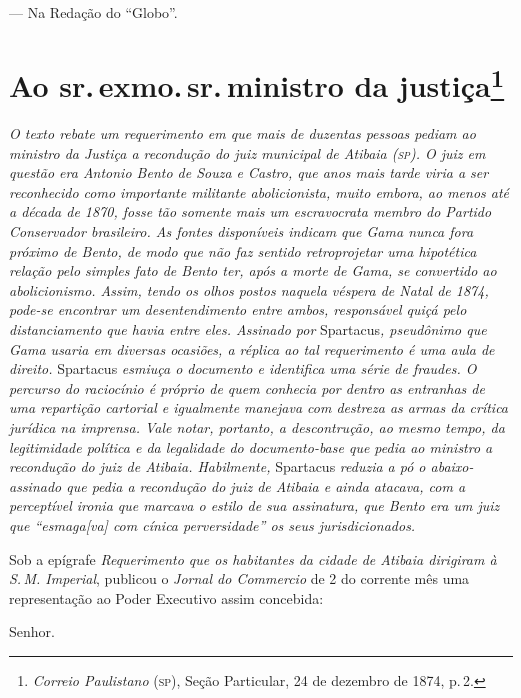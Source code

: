 --- Na Redação do ``Globo''.

\chapter{Ao sr.\,exmo.\,sr.\,ministro da justiça\footnote{\emph{Correio Paulistano} (\textsc{sp}), Seção Particular,
  24 de dezembro de 1874, p.\,2.}} %

\begin{didascalia}
\emph{O texto rebate um requerimento em que mais de duzentas pessoas
pediam ao ministro da Justiça a recondução do juiz municipal de Atibaia
(\textsc{sp}). O juiz em questão era Antonio Bento de Souza e Castro, que anos
mais tarde viria a ser reconhecido como importante militante
abolicionista, muito embora, ao menos até a década de 1870, fosse tão
somente mais um escravocrata membro do Partido Conservador brasileiro.
As fontes disponíveis indicam que Gama nunca fora próximo de Bento, de
modo que não faz sentido retroprojetar uma hipotética relação pelo
simples fato de Bento ter, após a morte de Gama, se convertido ao
abolicionismo. Assim, tendo os olhos postos naquela véspera de Natal de
1874, pode-se encontrar um desentendimento entre ambos, responsável
quiçá pelo distanciamento que havia entre eles. Assinado por}
Spartacus\emph{, pseudônimo que Gama usaria em diversas ocasiões, a
réplica ao tal requerimento é uma aula de direito.} Spartacus
\emph{esmiuça o documento e identifica uma série de fraudes. O percurso
do raciocínio é próprio de quem conhecia por dentro as entranhas de uma
repartição cartorial e igualmente manejava com destreza as armas da
crítica jurídica na imprensa. Vale notar, portanto, a descontrução, ao
mesmo tempo, da legitimidade política e da legalidade do documento-base
que pedia ao ministro a recondução do juiz de Atibaia. Habilmente,}
Spartacus \emph{reduzia a pó o abaixo-assinado que pedia a recondução do
juiz de Atibaia e ainda atacava, com a perceptível ironia que marcava o
estilo de sua assinatura, que Bento era um juiz que ``esmaga{[}va{]} com
cínica perversidade'' os seus jurisdicionados.}
\end{didascalia}

Sob a epígrafe \emph{Requerimento que os habitantes da cidade de Atibaia
dirigiram à S.\,M. Imperial}, publicou o \emph{Jornal do Commercio} de 2
do corrente mês uma representação ao Poder Executivo assim concebida:

Senhor.

